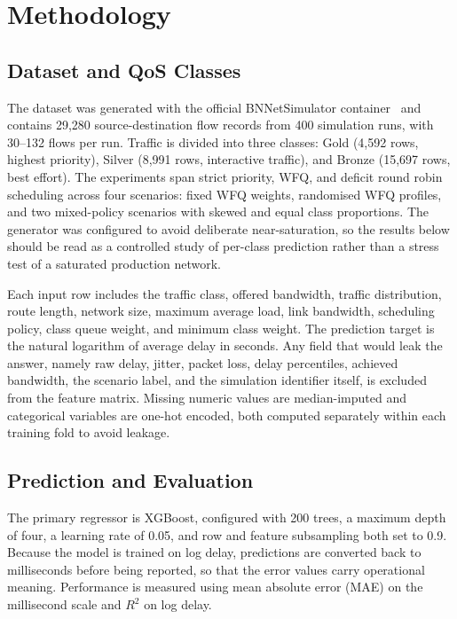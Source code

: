 \documentclass[conference]{IEEEtran}
\begin{document}
\section{Methodology}

\subsection{Dataset and QoS Classes}

The dataset was generated with the official BNNetSimulator container~\cite{bnnupc2023bnnetsimulator} and contains 29,280 source-destination flow records from 400 simulation runs, with 30--132 flows per run. Traffic is divided into three classes: Gold (4,592 rows, highest priority), Silver (8,991 rows, interactive traffic), and Bronze (15,697 rows, best effort). The experiments span strict priority, WFQ, and deficit round robin scheduling across four scenarios: fixed WFQ weights, randomised WFQ profiles, and two mixed-policy scenarios with skewed and equal class proportions. The generator was configured to avoid deliberate near-saturation, so the results below should be read as a controlled study of per-class prediction rather than a stress test of a saturated production network.

Each input row includes the traffic class, offered bandwidth, traffic distribution, route length, network size, maximum average load, link bandwidth, scheduling policy, class queue weight, and minimum class weight. The prediction target is the natural logarithm of average delay in seconds. Any field that would leak the answer, namely raw delay, jitter, packet loss, delay percentiles, achieved bandwidth, the scenario label, and the simulation identifier itself, is excluded from the feature matrix. Missing numeric values are median-imputed and categorical variables are one-hot encoded, both computed separately within each training fold to avoid leakage.

\subsection{Prediction and Evaluation}

The primary regressor is XGBoost, configured with 200 trees, a maximum depth of four, a learning rate of 0.05, and row and feature subsampling both set to 0.9. Because the model is trained on log delay, predictions are converted back to milliseconds before being reported, so that the error values carry operational meaning. Performance is measured using mean absolute error (MAE) on the millisecond scale and $R^2$ on log delay.
\end{document}
